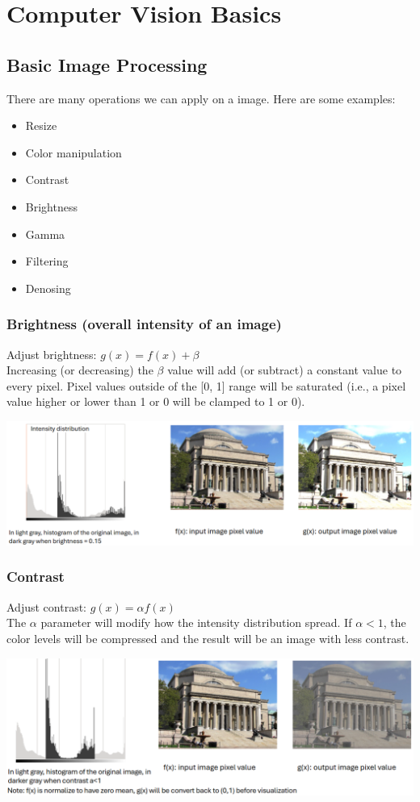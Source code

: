 \documentclass[10pt]{article}
\begin{document}
\section*{Computer Vision Basics}
\subsection*{Basic Image Processing}
There are many operations we can apply on a image.  Here are some examples:
\begin{itemize}
	\item Resize
	\item Color manipulation
	\item Contrast
	\item Brightness
	\item Gamma
	\item Filtering
	\item Denosing
\end{itemize}

\subsubsection*{Brightness (overall intensity of an image)}
Adjust brightness: $g(x) = f(x) + \beta$\\
Increasing (or decreasing) the $\beta$ value will add (or subtract) a constant value to every pixel.  Pixel values outside of the [0, 1] range will be saturated (i.e., a pixel value higher or lower than 1 or 0 will be clamped to 1 or 0).
\begin{center} 
	\includegraphics*[width=\textwidth]{L2_3.png} 
\end{center}

\subsubsection*{Contrast}
Adjust contrast: $g(x) = \alpha f(x)$\\
The $\alpha$ parameter will modify how the intensity distribution spread.  If $\alpha < 1$, the color levels will be compressed and the result will be an image with less contrast.
\begin{center} 
	\includegraphics*[width=\textwidth]{L2_4.png} 
\end{center}
\end{document}
